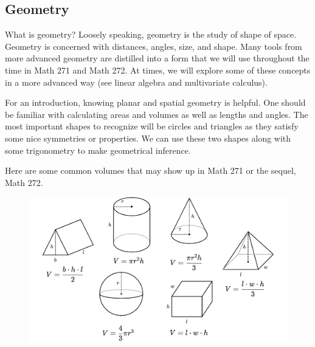     
    \subsection{Geometry}
    
    What is geometry? Loosely speaking, geometry is the study of shape of space.  Geometry is concerned with distances, angles, size, and shape.  Many tools from more advanced geometry are distilled into a form that we will use throughout the time in Math 271 and Math 272.  At times, we will explore some of these concepts in a more advanced way (see linear algebra and multivariate calculus).
    
    For an introduction, knowing planar and spatial geometry is helpful.  One should be familiar with calculating areas and volumes as well as lengths and angles. The most important shapes to recognize will be circles and triangles as they satisfy some nice symmetries or properties.  We can use these two shapes along with some trigonometry to make geometrical inference.
    
    Here are some common volumes that may show up in Math 271 or the sequel, Math 272.
    
    \begin{figure}[H]
        \centering
        \includegraphics[width=.8\textwidth]{Figures_Part_1/volumes.png}
        \label{fig:volumes}
    \end{figure}
    
    
    
    
